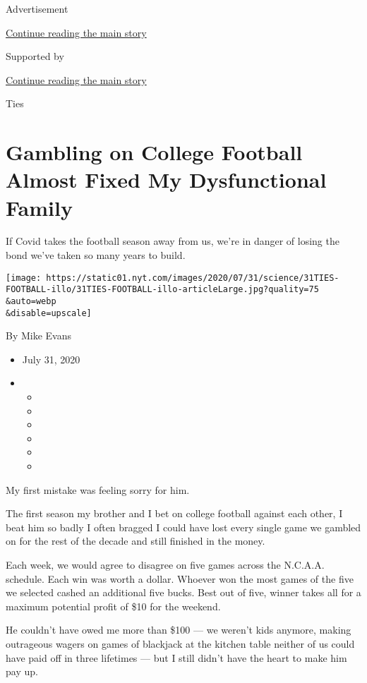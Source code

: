 Advertisement

\protect\hyperlink{after-top}{Continue reading the main story}

Supported by

\protect\hyperlink{after-sponsor}{Continue reading the main story}

Ties

\hypertarget{gambling-on-college-football-almost-fixed-my-dysfunctional-family}{%
\section{Gambling on College Football Almost Fixed My Dysfunctional
Family}\label{gambling-on-college-football-almost-fixed-my-dysfunctional-family}}

If Covid takes the football season away from us, we're in danger of
losing the bond we've taken so many years to build.

\texttt{[image: https://static01.nyt.com/images/2020/07/31/science/31TIES-FOOTBALL-illo/31TIES-FOOTBALL-illo-articleLarge.jpg?quality=75\\\&auto=webp\\\&disable=upscale]}

By Mike Evans

\begin{itemize}
\item
  July 31, 2020
\item
  \begin{itemize}
  \item
  \item
  \item
  \item
  \item
  \item
  \end{itemize}
\end{itemize}

My first mistake was feeling sorry for him.

The first season my brother and I bet on college football against each
other, I beat him so badly I often bragged I could have lost every
single game we gambled on for the rest of the decade and still finished
in the money.

Each week, we would agree to disagree on five games across the N.C.A.A.
schedule. Each win was worth a dollar. Whoever won the most games of the
five we selected cashed an additional five bucks. Best out of five,
winner takes all for a maximum potential profit of \$10 for the weekend.

He couldn't have owed me more than \$100 --- we weren't kids anymore,
making outrageous wagers on games of blackjack at the kitchen table
neither of us could have paid off in three lifetimes --- but I still
didn't have the heart to make him pay up.

